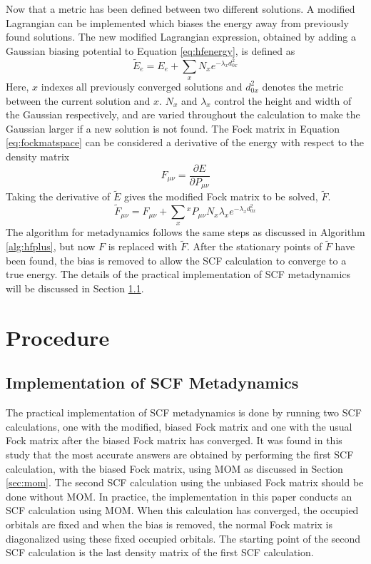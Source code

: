 \documentclass[final,3p,times,twocolumn]{elsarticle}
\begin{document}
Now that a metric has been defined between two different solutions. A modified Lagrangian can be implemented which biases the energy away from previously found solutions. The new modified Lagrangian expression, obtained by adding a Gaussian biasing potential to Equation \eqref{eq:hfenergy}, is defined as
\begin{equation} \label{eq:mdenergy}
\tilde E_e = E_e + \sum_x N_xe^{-\lambda_xd_{0x}^2}
\end{equation}
Here, $x$ indexes all previously converged solutions and $d_{0x}^2$ denotes the metric between the current solution and $x$. $N_x$ and $\lambda_x$ control the height and width of the Gaussian respectively, and are varied throughout the calculation to make the Gaussian larger if a new solution is not found. The Fock matrix in Equation \eqref{eq:fockmatspace} can be considered a derivative of the energy with respect to the density matrix
\begin{equation}
F_{\mu\nu} = \frac{\partial E}{\partial P_{\mu\nu}}
\end{equation}
Taking the derivative of $\tilde E$ gives the modified Fock matrix to be solved, $\tilde F$.
\begin{equation} \label{eq:biasfock}
\tilde F_{\mu\nu} = F_{\mu\nu} + \sum_x{}^xP_{\mu\nu}N_x\lambda_x e^{-\lambda_x d_{0x}^2}
\end{equation}
The algorithm for metadynamics follows the same steps as discussed in Algorithm \ref{alg:hfplus}, but now $F$ is replaced with $\tilde F$. After the stationary points of $\tilde F$ have been found, the bias is removed to allow the SCF calculation to converge to a true energy. The details of the practical implementation of SCF metadynamics will be discussed in Section \ref{sec:scfmdalg}.

\section{Procedure}

\subsection{Implementation of SCF Metadynamics} \label{sec:scfmdalg}
The practical implementation of SCF metadynamics is done by running two SCF calculations, one with the modified, biased Fock matrix and one with the usual Fock matrix after the biased Fock matrix has converged. It was found in this study that the most accurate answers are obtained by performing the first SCF calculation, with the biased Fock matrix, using MOM as discussed in Section \ref{sec:mom}. The second SCF calculation using the unbiased Fock matrix should be done without MOM. In practice, the implementation in this paper conducts an SCF calculation using MOM. When this calculation has converged, the occupied orbitals are fixed and when the bias is removed, the normal Fock matrix is diagonalized using these fixed occupied orbitals. The starting point of the second SCF calculation is the last density matrix of the first SCF calculation.
\end{document}
